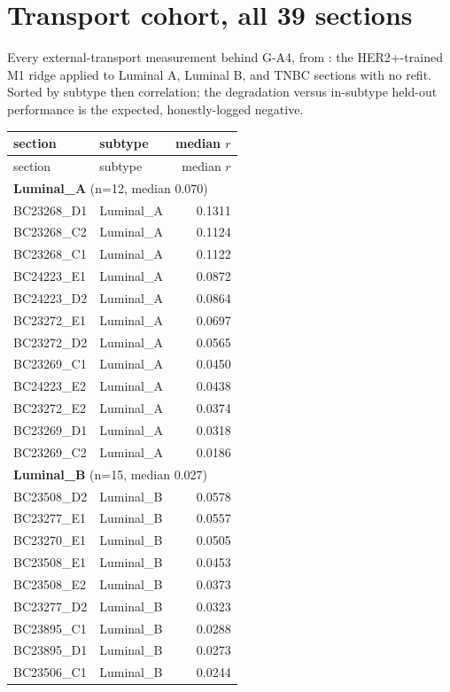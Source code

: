 \section{Transport cohort, all 39 sections}
{\sloppy Every external-transport measurement behind G-A4, from : the HER2+-trained M1 ridge applied to Luminal A, Luminal B, and TNBC sections with no refit. Sorted by subtype then correlation; the degradation versus in-subtype held-out performance is the expected, honestly-logged negative.\par}
\begin{longtable}{llr}\hline\hline section & subtype & median $r$\\\hline
\endfirsthead\hline\hline section & subtype & median $r$\\\hline\endhead
\multicolumn{3}{l}{\textbf{Luminal\_A} (n=12, median 0.070)}\\\hline
BC23268\_D1 & Luminal\_A & 0.1311\\
BC23268\_C2 & Luminal\_A & 0.1124\\
BC23268\_C1 & Luminal\_A & 0.1122\\
BC24223\_E1 & Luminal\_A & 0.0872\\
BC24223\_D2 & Luminal\_A & 0.0864\\
BC23272\_E1 & Luminal\_A & 0.0697\\
BC23272\_D2 & Luminal\_A & 0.0565\\
BC23269\_C1 & Luminal\_A & 0.0450\\
BC24223\_E2 & Luminal\_A & 0.0438\\
BC23272\_E2 & Luminal\_A & 0.0374\\
BC23269\_D1 & Luminal\_A & 0.0318\\
BC23269\_C2 & Luminal\_A & 0.0186\\
\multicolumn{3}{l}{\textbf{Luminal\_B} (n=15, median 0.027)}\\\hline
BC23508\_D2 & Luminal\_B & 0.0578\\
BC23277\_E1 & Luminal\_B & 0.0557\\
BC23270\_E1 & Luminal\_B & 0.0505\\
BC23508\_E1 & Luminal\_B & 0.0453\\
BC23508\_E2 & Luminal\_B & 0.0373\\
BC23277\_D2 & Luminal\_B & 0.0323\\
BC23895\_C1 & Luminal\_B & 0.0288\\
BC23895\_D1 & Luminal\_B & 0.0273\\
BC23506\_C1 & Luminal\_B & 0.0244\\

\end{longtable}
